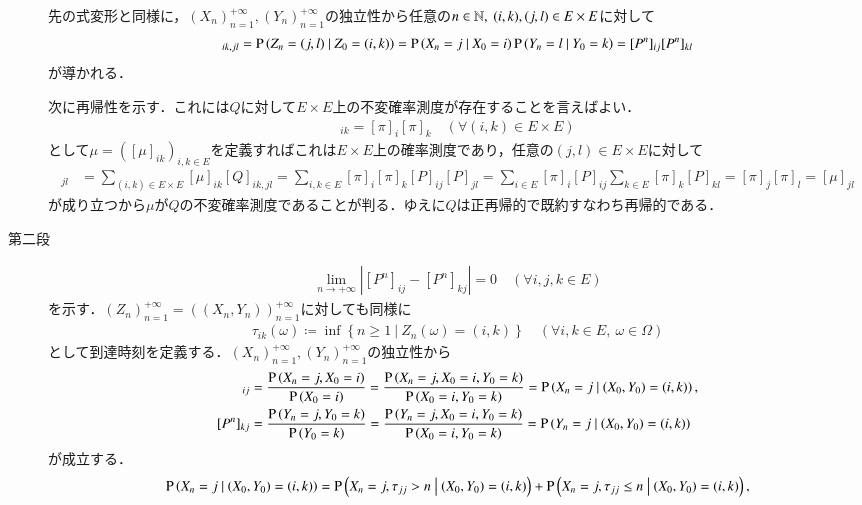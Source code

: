\begin{prf}
\begin{description}
\begin{rem}
			先の式変形と同様に，$(X_n)_{n=1}^{+\infty}, (Y_n)_{n=1}^{+\infty}$の独立性から任意の$n \in \mathbb{N},\ (i,k),(j,l) \in E \times E$に対して
			\begin{align}
				[Q^n]_{ik,jl} = \cprob{Z_n = (j,l)}{Z_0=(i,k)} = \cprob{X_n = j}{X_0=i}\cprob{Y_n = l}{Y_0=k} = [P^n]_{ij}[P^n]_{kl}
			\end{align}
			が導かれる．
		\end{rem}
		次に再帰性を示す．これには$Q$に対して$E \times E$上の不変確率測度が存在することを言えばよい．
		\begin{align}
			[\mu]_{ik} = [\pi]_i[\pi]_k \quad (\forall (i,k) \in E \times E)
		\end{align}
		として$\mu = ([\mu]_{ik})_{i,k \in E}$を定義すればこれは$E \times E$上の確率測度であり，任意の$(j,l) \in E \times E$に対して
		\begin{align}
			[\mu Q]_{jl} &= \sum_{(i,k) \in E \times E} [\mu]_{ik} [Q]_{ik,jl} 
			= \sum_{i,k \in E} [\pi]_i[\pi]_k [P]_{ij}[P]_{jl} 
			= \sum_{i \in E} [\pi]_i[P]_{ij}\sum_{k \in E} [\pi]_k[P]_{kl} 
			= [\pi]_j[\pi]_l
			= [\mu]_{jl}
		\end{align}
		が成り立つから$\mu$が$Q$の不変確率測度であることが判る．ゆえに$Q$は正再帰的で既約すなわち再帰的である．
	\item[第二段]
		\begin{align}
			\lim_{n \to +\infty} \left| [P^n]_{ij} - [P^n]_{kj} \right| = 0 \quad (\forall i,j,k \in E) \label{eq:discrete_ergodic}
		\end{align}
		を示す．$(Z_n)_{n=1}^{+\infty} = ((X_n, Y_n))_{n=1}^{+\infty}$に対しても同様に
		\begin{align}
			\tau_{ik}(\omega) \coloneqq \inf{}{\left\{ n \geq 1\ \left|\ Z_n(\omega) = (i,k) \right.\right\}} \quad (\forall i,k \in E,\ \omega \in \Omega)
		\end{align}
		として到達時刻を定義する．$(X_n)_{n=1}^{+\infty}, (Y_n)_{n=1}^{+\infty}$の独立性から
		\begin{align}
			[P^n]_{ij} &= \frac{\prob{X_n=j,X_0=i}}{\prob{X_0=i}} = \frac{\prob{X_n=j,X_0=i,Y_0=k}}{\prob{X_0=i,Y_0=k}} = \cprob{X_n=j}{(X_0,Y_0)=(i,k)},\\
			[P^n]_{kj} &= \frac{\prob{Y_n=j,Y_0=k}}{\prob{Y_0=k}} = \frac{\prob{Y_n=j,X_0=i,Y_0=k}}{\prob{X_0=i,Y_0=k}} = \cprob{Y_n=j}{(X_0,Y_0)=(i,k)}
		\end{align}
		が成立する．
		\begin{align}
			\cprob{X_n=j}{(X_0,Y_0)=(i,k)} &= \cprob{X_n=j, \tau_{jj} > n}{(X_0,Y_0)=(i,k)} + \cprob{X_n=j, \tau_{jj} \leq n}{(X_0,Y_0)=(i,k)}, \\

\end{align}
\end{description}
\end{prf}
